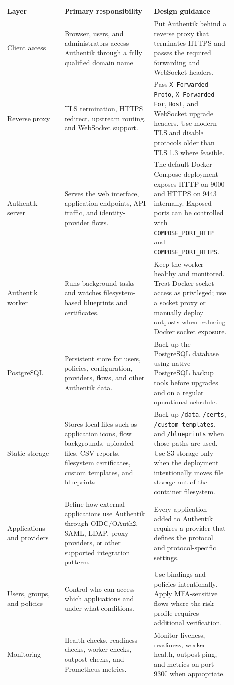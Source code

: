 \documentclass[11pt]{article}
\begin{document}
\begin{longtable}{>{\raggedright\arraybackslash}p{0.23\linewidth}>{\raggedright\arraybackslash}p{0.36\linewidth}>{\raggedright\arraybackslash}p{0.32\linewidth}}
\textbf{Layer} & \textbf{Primary responsibility} & \textbf{Design guidance} \\
\hline
Client access & Browser, users, and administrators access Authentik through a fully qualified domain name. & Put Authentik behind a reverse proxy that terminates HTTPS and passes the required forwarding and WebSocket headers. \\
Reverse proxy & TLS termination, HTTPS redirect, upstream routing, and WebSocket support. & Pass \texttt{X-Forwarded-Proto}, \texttt{X-Forwarded-For}, \texttt{Host}, and WebSocket upgrade headers. Use modern TLS and disable protocols older than TLS 1.3 where feasible. \\
Authentik server & Serves the web interface, application endpoints, API traffic, and identity-provider flows. & The default Docker Compose deployment exposes HTTP on 9000 and HTTPS on 9443 internally. Exposed ports can be controlled with \texttt{COMPOSE\_PORT\_HTTP} and \texttt{COMPOSE\_PORT\_HTTPS}. \\
Authentik worker & Runs background tasks and watches filesystem-based blueprints and certificates. & Keep the worker healthy and monitored. Treat Docker socket access as privileged; use a socket proxy or manually deploy outposts when reducing Docker socket exposure. \\
PostgreSQL & Persistent store for users, policies, configuration, providers, flows, and other Authentik data. & Back up the PostgreSQL database using native PostgreSQL backup tools before upgrades and on a regular operational schedule. \\
Static storage & Stores local files such as application icons, flow backgrounds, uploaded files, CSV reports, filesystem certificates, custom templates, and blueprints. & Back up \texttt{/data}, \texttt{/certs}, \texttt{/custom-templates}, and \texttt{/blueprints} when those paths are used. Use S3 storage only when the deployment intentionally moves file storage out of the container filesystem. \\
Applications and providers & Define how external applications use Authentik through OIDC/OAuth2, SAML, LDAP, proxy providers, or other supported integration patterns. & Every application added to Authentik requires a provider that defines the protocol and protocol-specific settings. \\
Users, groups, and policies & Control who can access which applications and under what conditions. & Use bindings and policies intentionally. Apply MFA-sensitive flows where the risk profile requires additional verification. \\
Monitoring & Health checks, readiness checks, worker checks, outpost checks, and Prometheus metrics. & Monitor liveness, readiness, worker health, outpost ping, and metrics on port 9300 when appropriate. \\
\end{longtable}
\end{document}
